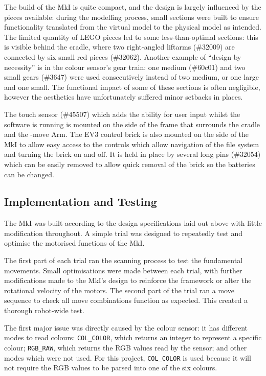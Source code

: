 \documentclass{report}
\newcommand{\legopiece}[1]{(\##1)}
\newcommand{\move}[1]{\uppercase{\texttt{\formatmovesnospace{#1}}}-move}
\newcommand{\lego}{LEGO }
\begin{document}
	The build of the MkI is quite compact, and the design is largely influenced by the pieces available: during the modelling process, small sections were built to ensure functionality translated from the virtual model to the physical model as intended. The limited quantity of \lego pieces led to some less-than-optimal sections: this is visible behind the cradle, where two right-angled liftarms \legopiece{32009} are connected by six small red pieces \legopiece{32062}. Another example of \enquote{design by necessity} is in the colour sensor's gear train: one medium \legopiece{60c01} and two small gears \legopiece{3647} were used consecutively instead of two medium, or one large and one small. The functional impact of some of these sections is often negligible, however the aesthetics have unfortunately suffered minor setbacks in places.
	
	The touch sensor \legopiece{45507} which adds the ability for user input whilst the software is running is mounted on the side of the frame that surrounds the cradle and the \move{x} Arm.  The EV3 control brick is also mounted on the side of the MkI to allow easy access to the controls which allow navigation of the file system and turning the brick on and off. It is held in place by several long pins \legopiece{32054} which can be easily removed to allow quick removal of the brick so the batteries can be changed.

	\subsection{Implementation and Testing}
	
	The MkI was built according to the design specifications laid out above with little modification throughout. A simple trial was designed to repeatedly test and optimise the motorised functions of the MkI.
	
	The first part of each trial ran the scanning process to test the fundamental movements. Small optimisations were made between each trial, with further modifications made to the MkI's design to reinforce the framework or alter the rotational velocity of the motors. The second part of the trial ran a move sequence to check all move combinations function as expected. This created a thorough robot-wide test.
	
	The first major issue was directly caused by the colour sensor: it has different modes to read colours: \lstinline|COL_COLOR|, which returns an integer to represent a specific colour; \lstinline|RGB_RAW|, which returns the RGB values read by the sensor; and other modes which were not used. For this project, \lstinline|COL_COLOR| is used because it will not require the RGB values to be parsed into one of the six colours.
	
\end{document}
